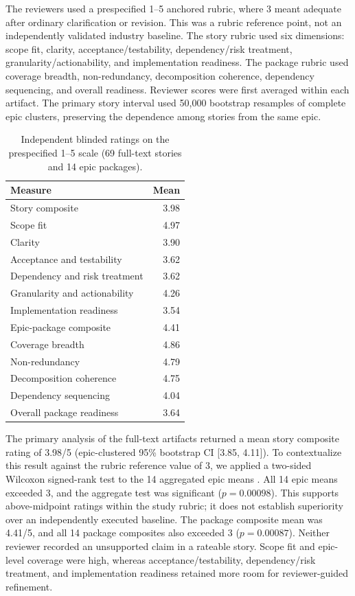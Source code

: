 \documentclass[manuscript,review]{acmart}
\begin{document}
The reviewers used a prespecified 1--5 anchored rubric, where 3 meant adequate after ordinary clarification or revision. This was a rubric reference point, not an independently validated industry baseline. The story rubric used six dimensions: scope fit, clarity, acceptance/testability, dependency/risk treatment, granularity/actionability, and implementation readiness. The package rubric used coverage breadth, non-redundancy, decomposition coherence, dependency sequencing, and overall readiness. Reviewer scores were first averaged within each artifact. The primary story interval used 50,000 bootstrap resamples of complete epic clusters, preserving the dependence among stories from the same epic.

\begin{table}[H]
\centering
\footnotesize
\caption{Independent blinded ratings on the prespecified 1--5 scale (69 full-text stories and 14 epic packages).}
\label{tab:blinded-artifact-review}
\begin{tabularx}{\columnwidth}{@{}Xr@{}}
\toprule
Measure & Mean \\
\midrule
Story composite & 3.98 \\
Scope fit & 4.97 \\
Clarity & 3.90 \\
Acceptance and testability & 3.62 \\
Dependency and risk treatment & 3.62 \\
Granularity and actionability & 4.26 \\
Implementation readiness & 3.54 \\
\midrule
Epic-package composite & 4.41 \\
Coverage breadth & 4.86 \\
Non-redundancy & 4.79 \\
Decomposition coherence & 4.75 \\
Dependency sequencing & 4.04 \\
Overall package readiness & 3.64 \\
\bottomrule
\end{tabularx}
\end{table}

The primary analysis of the full-text artifacts returned a mean story composite rating of 3.98/5 (epic-clustered 95\% bootstrap CI [3.85, 4.11]). To contextualize this result against the rubric reference value of 3, we applied a two-sided Wilcoxon signed-rank test to the 14 aggregated epic means \cite{R99}. All 14 epic means exceeded 3, and the aggregate test was significant (\(p=0.00098\)). This supports above-midpoint ratings within the study rubric; it does not establish superiority over an independently executed baseline. The package composite mean was 4.41/5, and all 14 package composites also exceeded 3 (\(p=0.00087\)). Neither reviewer recorded an unsupported claim in a rateable story. Scope fit and epic-level coverage were high, whereas acceptance/testability, dependency/risk treatment, and implementation readiness retained more room for reviewer-guided refinement.
\end{document}
